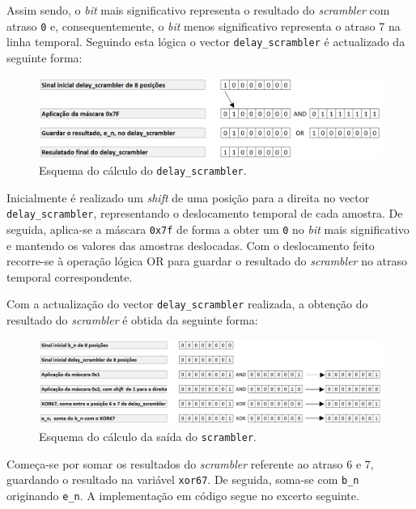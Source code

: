\documentclass[11pt]{article}
\numberwithin{equation}{section}
\begin{document}
Assim sendo, o \textit{bit} mais significativo representa o resultado do \textit{scrambler} com atraso \texttt{0} e, consequentemente, o \textit{bit} menos significativo representa o atraso 7 na linha temporal. Seguindo esta lógica o vector \texttt{delay\_scrambler} é actualizado da seguinte forma:

\begin{figure}[H]
	\centering
	\includegraphics[keepaspectratio=true, scale=0.40]{teoricas/calculodoscrambler}
	\caption{Esquema do cálculo do \texttt{delay\_scrambler}.}
	\vspace{-0.8em}
\end{figure}

Inicialmente é realizado um \textit{shift} de uma posição para a direita no vector \texttt{delay\_scrambler}, representando o deslocamento temporal de cada amostra. De seguida, aplica-se a máscara \texttt{0x7f} de forma a obter um \texttt{0} no \textit{bit} mais significativo e mantendo os valores das amostras deslocadas. Com o deslocamento feito recorre-se à operação lógica OR para guardar o resultado do \textit{scrambler} no atraso temporal correspondente.

Com a actualização do vector \texttt{delay\_scrambler} realizada, a obtenção do resultado do \textit{scrambler} é obtida da seguinte forma:  

\begin{figure}[H]
	\centering
	\includegraphics[keepaspectratio=true, scale=0.40]{teoricas/calculodeen}
	\caption{Esquema do cálculo da saída do \texttt{scrambler}.}
	\vspace{-0.8em}
\end{figure}

Começa-se por somar os resultados do \textit{scrambler} referente ao atraso 6 e 7, guardando o resultado na variável \texttt{xor67}. De seguida, soma-se com \texttt{b\_n} originando \texttt{e\_n}. A implementação em código segue no excerto seguinte.
\end{document}

